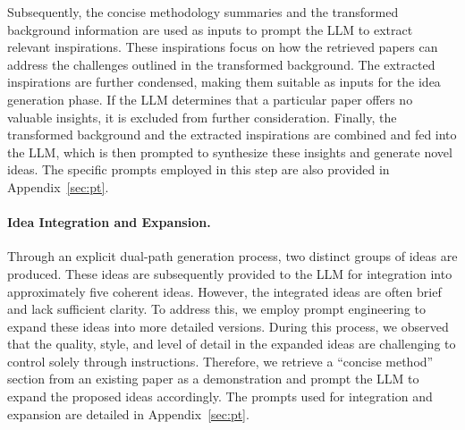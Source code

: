 \documentclass{article}
\theoremstyle{plain}
\theoremstyle{definition}
\theoremstyle{remark}
\begin{document}
Subsequently, the concise methodology summaries and the transformed background information are used as inputs to prompt the LLM to extract relevant inspirations. These inspirations focus on how the retrieved papers can address the challenges outlined in the transformed background. The extracted inspirations are further condensed, making them suitable as inputs for the idea generation phase. If the LLM determines that a particular paper offers no valuable insights, it is excluded from further consideration. Finally, the transformed background and the extracted inspirations are combined and fed into the LLM, which is then prompted to synthesize these insights and generate novel ideas. The specific prompts employed in this step are also provided in Appendix~\ref{sec:pt}.

\paragraph{Idea Integration and Expansion.} Through an explicit dual-path generation process, two distinct groups of ideas are produced. These ideas are subsequently provided to the LLM for integration into approximately five coherent ideas. However, the integrated ideas are often brief and lack sufficient clarity. To address this, we employ prompt engineering to expand these ideas into more detailed versions. During this process, we observed that the quality, style, and level of detail in the expanded ideas are challenging to control solely through instructions. Therefore, we retrieve a ``concise method'' section from an existing paper as a demonstration and prompt the LLM to expand the proposed ideas accordingly. The prompts used for integration and expansion are detailed in Appendix~\ref{sec:pt}.

\begin{table}[t]\footnotesize
\centering  %
\caption{The subjective evaluation metrics of ideas quality. Higher means better.}  %
\label{tab:metrics}  %
\end{table}
\end{document}
